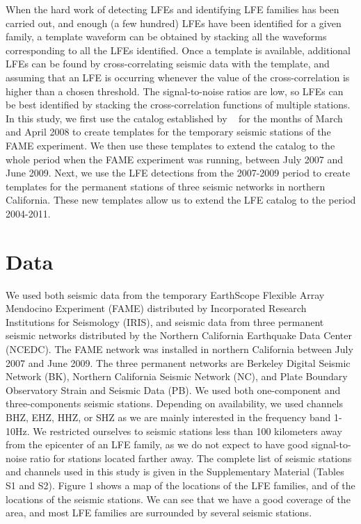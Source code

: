 \documentclass[draft]{agujournal2019}
\begin{document}
When the hard work of detecting LFEs and identifying LFE families has been carried out, and enough (a few hundred) LFEs have been identified for a given family, a template waveform can be obtained by stacking all the waveforms corresponding to all the LFEs identified. Once a template is available, additional LFEs can be found by cross-correlating seismic data with the template, and assuming that an LFE is occurring whenever the value of the cross-correlation is higher than a chosen threshold.  The signal-to-noise ratios are low, so LFEs can be best identified by stacking the cross-correlation functions of multiple stations. In this study, we first use the catalog established by ~ for the months of March and April 2008 to create templates for the temporary seismic stations of the FAME experiment. We then use these templates to extend the catalog to the whole period when the FAME experiment was running, between July 2007 and June 2009. Next, we use the LFE detections from the 2007-2009 period to create templates for the permanent stations of three seismic networks in northern California. These new templates allow us to extend the LFE catalog to the period 2004-2011.

\section{Data}

We used both seismic data from the temporary EarthScope Flexible Array Mendocino Experiment (FAME) distributed by Incorporated Research Institutions for Seismology (IRIS), and seismic data from three permanent seismic networks distributed by the Northern California Earthquake Data Center (NCEDC). The FAME network was installed in northern California between July 2007 and June 2009. The three permanent networks are Berkeley Digital Seismic Network (BK), Northern California Seismic Network (NC), and Plate Boundary Observatory Strain and Seismic Data (PB). We used both one-component and three-components seismic stations. Depending on availability, we used channels BHZ, EHZ, HHZ, or SHZ as we are mainly interested in the frequency band 1-10Hz. We restricted ourselves to seismic stations less than 100 kilometers away from the epicenter of an LFE family, as we do not expect to have good signal-to-noise ratio for stations located farther away. The complete list of seismic stations and channels used in this study is given in the Supplementary Material (Tables S1 and S2). Figure 1 shows a map of the locations of the LFE families, and of the locations of the seismic stations. We can see that we have a good coverage of the area, and most LFE families are surrounded by several seismic stations. \\
\end{document}
